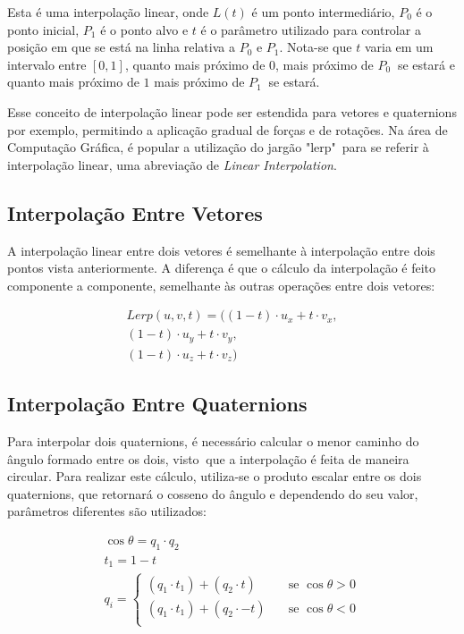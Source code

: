 Esta é uma interpolação linear, onde $L(t)$ é um ponto intermediário, $P_0$ é o ponto 
inicial, $P_1$ é o ponto alvo e $t$ é o parâmetro utilizado para controlar a posição em 
que se está na linha relativa a $P_0$ e $P_1$. Nota-se que $t$ varia em um intervalo 
entre $[0,1]$, quanto mais próximo de $0$, mais próximo de $P_0\ $ se estará e quanto 
mais próximo de $1$ mais próximo de $P_1\ $ se estará. 

Esse conceito de interpolação linear pode ser estendida para vetores e quaternions por 
exemplo, permitindo a aplicação gradual de forças e de rotações.
Na área de Computação Gráfica, é popular a utilização do jargão "lerp"\ para se referir 
à interpolação linear, uma abreviação de \textit{Linear Interpolation}.

\subsection{Interpolação Entre Vetores}

A interpolação linear entre dois vetores é semelhante à interpolação entre dois pontos 
vista anteriormente. A diferença é que o cálculo da interpolação é feito componente a 
componente, semelhante às outras operações entre dois vetores:

\begin{equation}
    \begin{aligned}
        Lerp(u,v,t) = ((1 - t) \cdotp u_x + t \cdotp v_x, \\
                      (1 - t) \cdotp u_y + t \cdotp v_y, \\
                      (1 - t) \cdotp u_z + t \cdotp v_z)
    \end{aligned}
\end{equation}

\vspace{1cm}

\subsection{Interpolação Entre Quaternions}

Para interpolar dois quaternions, é necessário calcular o menor caminho do ângulo formado 
entre os dois, visto$\ $ que a interpolação é feita de maneira circular. Para realizar este 
cálculo, utiliza-se o produto escalar entre os dois quaternions, que retornará o cosseno 
do ângulo e dependendo do seu valor, parâmetros diferentes são utilizados:

\begin{equation}
    \begin{aligned}
        \cos \theta = q_1 \cdotp q_2 \\
        t_1 = 1 - t \\
        q_i = 
        \begin{cases}
            (q_1 \cdotp t_1) + (q_2 \cdotp t) & \quad \text{se } \cos \theta > 0 \\
            (q_1 \cdotp t_1) + (q_2 \cdotp -t) & \quad \text{se } \cos \theta < 0 \\
        \end{cases}
    \end{aligned}
\end{equation}

